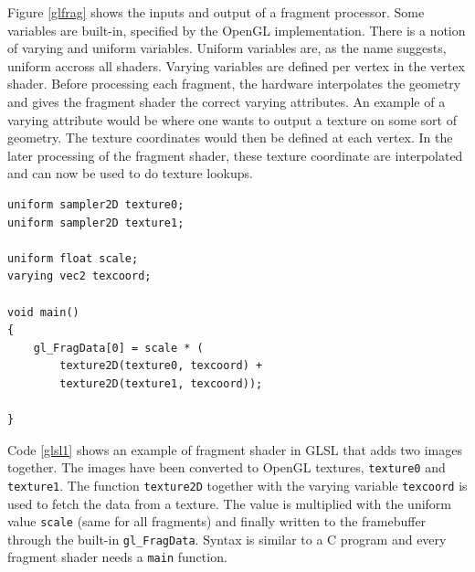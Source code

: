 Figure \ref{glfrag} shows the inputs and output of a fragment processor. Some variables are built-in, specified by the OpenGL implementation. There is a notion of varying and uniform variables. Uniform variables are, as the name suggests, uniform accross all shaders. Varying variables are defined per vertex in the vertex shader. Before processing each fragment, the hardware interpolates the geometry and gives the fragment shader the correct varying attributes. An example of a varying attribute would be where one wants to output a texture on some sort of geometry. The texture coordinates would then be defined at each vertex. In the later processing of the fragment shader, these texture coordinate are interpolated and can now be used to do texture lookups. 

\renewcommand{\lstlistingname}{Code}
\begin{lstlisting}[caption= Example of adding two images in GLSL, label=glsl1]
uniform sampler2D texture0;
uniform sampler2D texture1;

uniform float scale;
varying vec2 texcoord;

void main()
{
    gl_FragData[0] = scale * (
        texture2D(texture0, texcoord) + 
        texture2D(texture1, texcoord));

}
\end{lstlisting}

Code \ref{glsl1} shows an example of fragment shader in GLSL that adds two images together. The images have been converted to OpenGL textures, \texttt{texture0} and \texttt{texture1}. The function \texttt{texture2D} together with the varying variable \texttt{texcoord} is used to fetch the data from a texture. The value is multiplied with the uniform value \texttt{scale} (same for all fragments) and finally written to the framebuffer through the built-in \texttt{gl\_FragData}. Syntax is similar to a C program and every fragment shader needs a \texttt{main} function.
